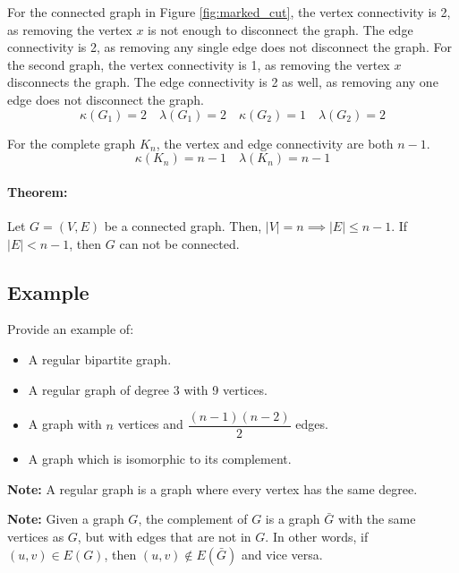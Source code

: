 \documentclass[11pt]{article}
\begin{document}
For the connected graph in Figure \ref{fig:marked_cut}, the vertex connectivity is 2, as removing the vertex $x$ is not enough to disconnect the graph. The edge connectivity is 2, as removing any single edge does not disconnect the graph. For the second graph, the vertex connectivity is 1, as removing the vertex $x$ disconnects the graph. The edge connectivity is 2 as well, as removing any one edge does not disconnect the graph.
\[
\kappa (G_1) = 2 \quad \lambda (G_1) = 2 \quad \kappa (G_2) = 1 \quad \lambda (G_2) = 2
\]

For the complete graph $K_n$, the vertex and edge connectivity are both $n-1$.
\[
\kappa (K_n) = n-1 \quad \lambda (K_n) = n-1
\]

\paragraph{Theorem:} Let $G = (V,E)$ be a connected graph. Then, $|V| = n \implies |E| \leq n-1$.
If $|E| < n-1$, then $G$ can not be connected.

\subsection*{Example}
Provide an example of:
\begin{itemize}
    \item A regular bipartite graph.
    \item A regular graph of degree 3 with 9 vertices.
    \item A graph with $n$ vertices and $\dfrac{(n-1)(n-2)}{2}$ edges.
    \item A graph which is isomorphic to its complement.
\end{itemize}

\textbf{Note: } A regular graph is a graph where every vertex has the same degree.

\textbf{Note: } Given a graph $G$, the complement of $G$ is a graph $\bar{G}$ with the same vertices as $G$, but with edges that are not in $G$. In other words, if $(u,v) \in E(G)$, then $(u,v) \notin E(\bar{G})$ and vice versa.
\end{document}
